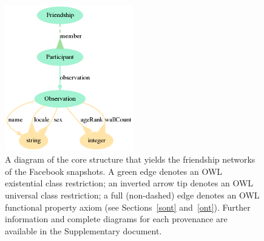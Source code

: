 \documentclass[data,datadescriptor,submit,moreauthors,pdftex]{Definitions/mdpi}
\begin{document}
\begin{figure}[H]
    \centering
    \includegraphics[width=0.5\textwidth]{../ontologies/facebook-legacy-AntonioAnzoategui18022013Friendship.ttl/draw}
    \caption{A diagram of the core structure that yields the friendship networks
    of the Facebook snapshots. A green edge denotes an OWL existential class restriction; an inverted arrow tip denotes an OWL universal class restriction;
    a full (non-dashed) edge denotes an OWL functional property axiom (see Sections~\ref{sont} and~\ref{ont}). Further information and complete diagrams for each provenance are available in the Supplementary document.}\label{dia}
\end{figure}
\end{document}
